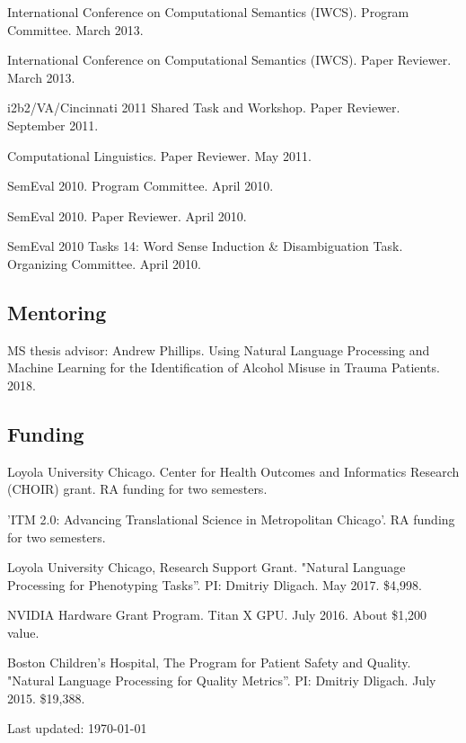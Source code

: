 \documentclass[letterpaper]{article}
\renewenvironment{itemize}{
  \begin{list}{}{
    \setlength{\leftmargin}{1.5em}
  }
}{
  \end{list}
}
\begin{document}
\begin{itemize}
\item International Conference on Computational Semantics (IWCS). Program Committee. March 2013.
\item International Conference on Computational Semantics (IWCS). Paper Reviewer. March 2013.
\item i2b2/VA/Cincinnati 2011 Shared Task and Workshop. Paper Reviewer. September 2011.
\item Computational Linguistics. Paper Reviewer. May 2011.
\item SemEval 2010. Program Committee. April 2010.
\item SemEval 2010. Paper Reviewer. April 2010.
\item SemEval 2010 Tasks 14: Word Sense Induction \& Disambiguation Task. Organizing Committee. April 2010.
\end{itemize}

\subsection*{Mentoring}

\begin{itemize}
\item MS thesis advisor: Andrew Phillips. Using Natural Language Processing and Machine Learning for the Identification of Alcohol Misuse in Trauma Patients. 2018.
\end{itemize}

\subsection*{Funding}

\begin{itemize}

\item Loyola University Chicago. Center for Health Outcomes and Informatics Research (CHOIR) grant. RA funding for two semesters.
\item 'ITM 2.0: Advancing Translational Science in Metropolitan Chicago'. RA funding for two semesters.
\item Loyola University Chicago, Research Support Grant. "Natural Language Processing for Phenotyping Tasks''. PI: Dmitriy Dligach. May 2017. \$4,998.
\item NVIDIA Hardware Grant Program. Titan X GPU. July 2016. About \$1,200 value.
\item Boston Children's Hospital, The Program for Patient Safety and Quality. "Natural Language Processing for Quality Metrics''. PI: Dmitriy Dligach. July 2015. \$19,388.
\end{itemize}


\bigskip

\begin{center}
\begin{footnotesize}
Last updated: \today \\
\end{footnotesize}
\end{center}
\end{document}
